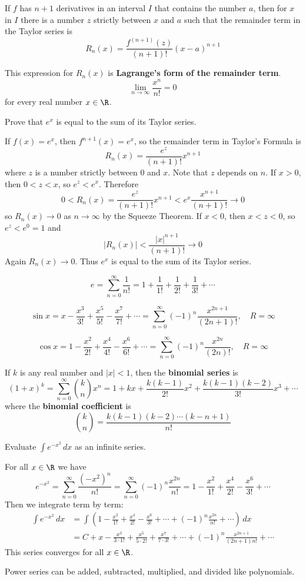 \begin{theorem}
    If \(f\) has \(n+1\) derivatives in an interval \(I\) that contains the
    number \(a\), then for \(x\) in \(I\) there is a number \(z\) strictly
    between \(x\) and \(a\) such that the remainder term in the Taylor series
    is
    \[R_n(x)=\frac{f^{(n+1)}(z)}{(n+1)!}(x-a)^{n+1}\]
\end{theorem}
This expression for \(R_n(x)\) is
\textbf{Lagrange's form of the remainder term}.
\[\lim_{n\to\infty}\frac{x^n}{n!}=0\] for every real number \(x\in\R\).
\begin{problem}
    Prove that \(e^x\) is equal to the sum of its Taylor series.
\end{problem}
\begin{solution}
    If \(f(x)=e^x\), then \(f^{n+1}(x)=e^x\), so the remainder term in
    Taylor's Formula is
    \[R_n(x)=\frac{e^z}{(n+1)!}x^{n+1}\]
    where \(z\) is a number strictly between \(0\) and \(x\).
    Note that \(z\) depends on \(n\).
    If \(x>0\), then \(0<z<x\), so \(e^z<e^x\).
    Therefore
    \[0<R_n(x)=\frac{e^z}{(n+1)!}x^{n+1}<e^x\frac{x^{n+1}}{(n+1)!}\to 0\]
    so \(R_n(x)\to 0\) as \(n\to\infty\) by the Squeeze Theorem.
    If \(x<0\), then \(x<z<0\), so \(e^z<e^0=1\) and
    \[|R_n(x)|<\frac{|x|^{n+1}}{(n+1)!}\to 0\]
    Again \(R_n(x)\to 0\).
    Thus \(e^x\) is equal to the sum of its Taylor series.
\end{solution}
\[e=\sum_{n=0}^\infty\frac{1}{n!}=1+\frac{1}{1!}+\frac{1}{2!}+\frac{1}{3!}+\cdots\]

\[\sin x=x-\frac{x^3}{3!}+\frac{x^5}{5!}-\frac{x^7}{7!}+\cdots
=\sum_{n=0}^\infty(-1)^n\frac{x^{2n+1}}{(2n+1)!},\quad R=\infty\]

\[\cos x=1-\frac{x^2}{2!}+\frac{x^4}{4!}-\frac{x^6}{6!}+\cdots
=\sum_{n=0}^\infty(-1)^n\frac{x^{2n}}{(2n)!},\quad R=\infty\]

If \(k\) is any real number and \(|x|<1\), then the \textbf{binomial series}
is
\[(1+x)^k=\sum_{n=0}^\infty\binom{k}{n}x^n=1+kx+\frac{k(k-1)}{2!}x^2
+\frac{k(k-1)(k-2)}{3!}x^3+\cdots\]
where the \textbf{binomial coefficient} is
\[\binom{k}{n}=\frac{k(k-1)(k-2)\cdots(k-n+1)}{n!}\]
\begin{problem}
    Evaluate \(\displaystyle{\int e^{-x^2}}\,dx\) as an infinite series.
\end{problem}
\begin{solution}
    For all \(x\in\R\) we have
    \[e^{-x^2}=\sum_{n=0}^\infty\frac{(-x^2)^n}{n!}
    =\sum_{n=0}^\infty(-1)^n\frac{x^{2n}}{n!}
    =1-\frac{x^2}{1!}+\frac{x^4}{2!}-\frac{x^6}{3!}+\cdots\]
    Then we integrate term by term:
    \begin{align*}
        \int e^{-x^2}\,dx &= \int \left(1-\frac{x^2}{1!}+\frac{x^4}{2!}
        -\frac{x^6}{3!}+\cdots+(-1)^n\frac{x^{2n}}{n!}+\cdots\right)\,dx \\
        &= C+x-\frac{x^3}{3\cdot 1!}+\frac{x^5}{5\cdot 2!}
        +\frac{x^7}{7\cdot 3!}+\cdots+(-1)^n\frac{x^{2n+1}}{(2n+1)n!}+\cdots
    \end{align*}
    This series converges for all \(x\in\R\).
\end{solution}
Power series can be added, subtracted, multiplied, and divided like
polynomials.